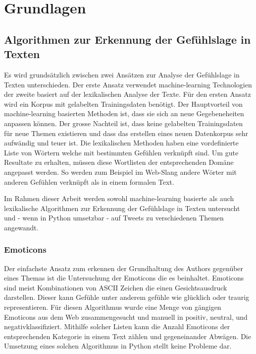 \clearpage
\section{Grundlagen}
\subsection{Algorithmen zur Erkennung der Gefühlslage in Texten}
Es wird grundsätzlich zwischen zwei Ansätzen zur Analyse der Gefühlslage in Texten unterschieden. Der erste Ansatz verwendet machine-learning Technologien der zweite basiert auf der lexikalischen Analyse der Texte. Für den ersten Ansatz wird ein Korpus mit gelabelten Trainingsdaten benötigt. \cite{thumbs_up} Der Hauptvorteil von machine-learning basierten Methoden ist, dass sie sich an neue Gegebeneheiten anpassen können. Der grosse Nachteil ist, dass keine gelabelten Trainingsdaten für neue Themen existieren und dass das erstellen eines neuen Datenkorpus sehr aufwändig und teuer ist. Die lexikalischen Methoden haben eine vordefinierte Liste von Wörtern welche mit bestimmten Gefühlen verknüpft sind. Um gute Resultate zu erhalten, müssen diese Wortlisten der entsprechenden Domäne angepasst werden. So werden zum Beispiel im Web-Slang andere Wörter mit anderen Gefühlen verknüpft als in einem formalen Text. \cite{comparing}

Im Rahmen dieser Arbeit werden sowohl machine-learning basierte als auch lexikalische Algorithmen zur Erkennung der Gefühlslage in Texten untersucht und - wenn in Python umsetzbar - auf Tweets zu verschiedenen Themen angewandt.

\subsubsection{Emoticons}
Der einfachste Ansatz zum erkennen der Grundhaltung des Authors gegenüber eines Themas ist die Untersuchung der Emoticons die es beinhaltet. Emoticons sind meist Kombinationen von ASCII Zeichen die einen Gesichtsausdruck darstellen. Dieser kann Gefühle unter anderem gefühle wie glücklich oder traurig representieren. Für diesen Algorithmus wurde eine Menge von gängigen Emoticons aus dem Web \cite{emoticons1}\cite{emoticons2}\cite{emoticons3}\cite{emoticons4} zusammengesucht und manuell in \flqq positiv\frqq, \flqq neutral\frqq, und \flqq negativ\frqq klassifiziert. Mithilfe solcher Listen kann die Anzahl Emoticons der entsprechenden Kategorie in einem Text zählen und gegeneinander Abwägen. \cite{comparing} Die Umsetzung eines solchen Algorithmus in Python stellt keine Probleme dar.


